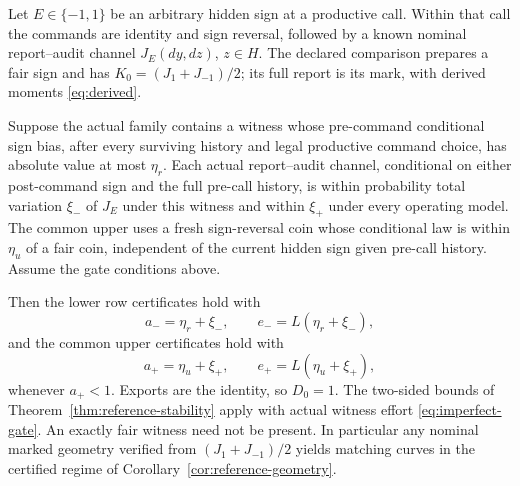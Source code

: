 \begin{theorem}\label{thm:classical-calibrated}
Let $E\in\{-1,1\}$ be an arbitrary hidden sign at a productive call. Within that call the commands are identity and sign reversal, followed by a known nominal report--audit channel $J_E(dy,dz)$, $z\in H$. The declared comparison prepares a fair sign and has
$K_0=(J_1+J_{-1})/2$; its full report is its mark, with derived moments \eqref{eq:derived}.

Suppose the actual family contains a witness whose pre-command conditional sign bias, after every surviving history and legal productive command choice, has absolute value at most $\eta_r$. Each actual report--audit channel, conditional on either post-command sign and the full pre-call history, is within probability total variation $\xi_-$ of $J_E$ under this witness and within $\xi_+$ under every operating model. The common upper uses a fresh sign-reversal coin whose conditional law is within $\eta_u$ of a fair coin, independent of the current hidden sign given pre-call history. Assume the gate conditions above.

Then the lower row certificates hold with
\[
 a_-=\eta_r+\xi_-,\qquad e_-=L(\eta_r+\xi_-),
\]
and the common upper certificates hold with
\[
 a_+=\eta_u+\xi_+,\qquad e_+=L(\eta_u+\xi_+),
\]
whenever $a_+<1$. Exports are the identity, so $D_0=1$. The two-sided bounds of Theorem~\ref{thm:reference-stability} apply with actual witness effort \eqref{eq:imperfect-gate}. An exactly fair witness need not be present. In particular any nominal marked geometry verified from $(J_1+J_{-1})/2$ yields matching curves in the certified regime of Corollary~\ref{cor:reference-geometry}.
\end{theorem}
